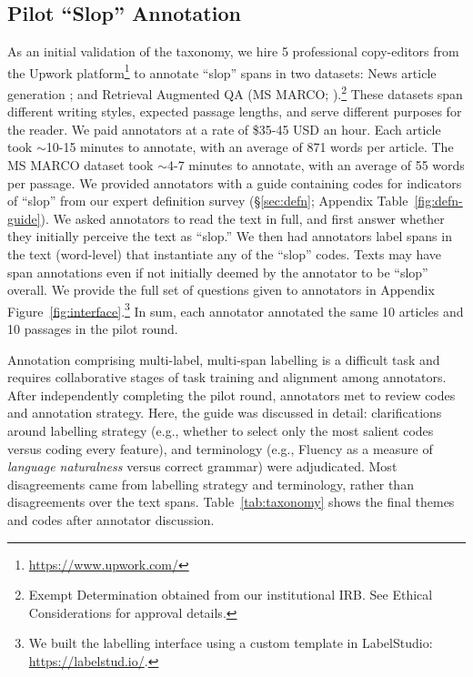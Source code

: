 \documentclass{article} %
\begin{document}
\subsection{Pilot ``Slop'' Annotation}
As an initial validation of the taxonomy, we hire 5 professional copy-editors from the Upwork platform\footnote{\url{https://www.upwork.com/}} to annotate ``slop'' spans in two datasets: News article generation \citep{Russell2025PeopleWF}; and Retrieval Augmented QA (MS MARCO; \citealp{Campos2016MSMA}).\footnote{Exempt Determination obtained from our institutional IRB. 
See Ethical Considerations for approval details.} 
These datasets span different writing styles, expected passage lengths, and serve different purposes for the reader.
We paid annotators at a rate of \$35-45 USD an hour.
Each article took $\sim$10-15 minutes to annotate, with an average of 871 words per article. 
The MS MARCO dataset took $\sim$4-7 minutes to annotate, with an average of 55 words per passage.
We provided annotators with a guide containing codes for indicators of ``slop'' from our expert definition survey (\S\ref{sec:defn}; Appendix Table~\ref{fig:defn-guide}). 
We asked annotators to read the text in full, and first answer whether they initially perceive the text as ``slop.'' 
We then had annotators label spans in the text (word-level) that instantiate any of the ``slop'' codes. 
Texts may have span annotations even if not initially deemed by the annotator to be ``slop'' overall. 
We provide the full set of questions given to annotators in Appendix Figure~\ref{fig:interface}.\footnote{We built the labelling interface using a  custom template in LabelStudio: \url{https://labelstud.io/}.}
In sum, each annotator annotated the same 10 articles and 10 passages in the pilot round.

Annotation comprising multi-label, multi-span labelling is a difficult task and requires collaborative stages of task training and alignment among annotators. 
 After independently completing the pilot round, annotators met to review codes and annotation strategy. 
Here, the guide was discussed in detail: clarifications around labelling strategy (e.g., whether to select only the most salient codes versus coding every feature), and terminology (e.g., Fluency as a measure of \textit{language naturalness} versus correct grammar) were adjudicated. Most disagreements came from labelling strategy and terminology, rather than disagreements over the text spans.
Table~\ref{tab:taxonomy} shows the final themes and codes after annotator discussion. 
\end{document}
